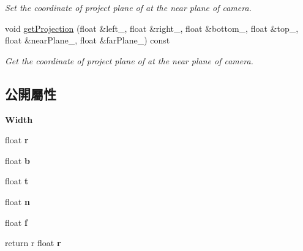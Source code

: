 \begin{DoxyCompactItemize}
\begin{DoxyCompactList}\small\item\em Set the coordinate of project plane of at the near plane of camera. \end{DoxyCompactList}\item 
void \hyperlink{class_magnum_1_1_orthographic_camera_component_a0b65352cd50f14c0b801bb5ac427c1fd}{get\+Projection} (float \&left\+\_\+, float \&right\+\_\+, float \&bottom\+\_\+, float \&top\+\_\+, float \&near\+Plane\+\_\+, float \&far\+Plane\+\_\+) const 
\begin{DoxyCompactList}\small\item\em Get the coordinate of project plane of at the near plane of camera. \end{DoxyCompactList}\end{DoxyCompactItemize}
\subsection*{公開屬性}
\begin{DoxyCompactItemize}
\item 
{\bfseries Width}\hypertarget{class_magnum_1_1_orthographic_camera_component_a6386c9f870a19fcc24b313639fd74b27}{}\label{class_magnum_1_1_orthographic_camera_component_a6386c9f870a19fcc24b313639fd74b27}

\item 
float {\bfseries r}
\item 
float {\bfseries b}\hypertarget{class_magnum_1_1_orthographic_camera_component_ad6615eddc61584e7eab087ebb6267dbf}{}\label{class_magnum_1_1_orthographic_camera_component_ad6615eddc61584e7eab087ebb6267dbf}

\item 
float {\bfseries t}\hypertarget{class_magnum_1_1_orthographic_camera_component_a439c22c478e441465c1565554a07607e}{}\label{class_magnum_1_1_orthographic_camera_component_a439c22c478e441465c1565554a07607e}

\item 
float {\bfseries n}\hypertarget{class_magnum_1_1_orthographic_camera_component_a6cee4d17c112a6af5c7eb062a0c3eeb8}{}\label{class_magnum_1_1_orthographic_camera_component_a6cee4d17c112a6af5c7eb062a0c3eeb8}

\item 
float {\bfseries f}\hypertarget{class_magnum_1_1_orthographic_camera_component_a9192c6b31242d5341f071b7e2f74ed56}{}\label{class_magnum_1_1_orthographic_camera_component_a9192c6b31242d5341f071b7e2f74ed56}

\item 
return r float {\bfseries r}
\end{DoxyCompactItemize}
